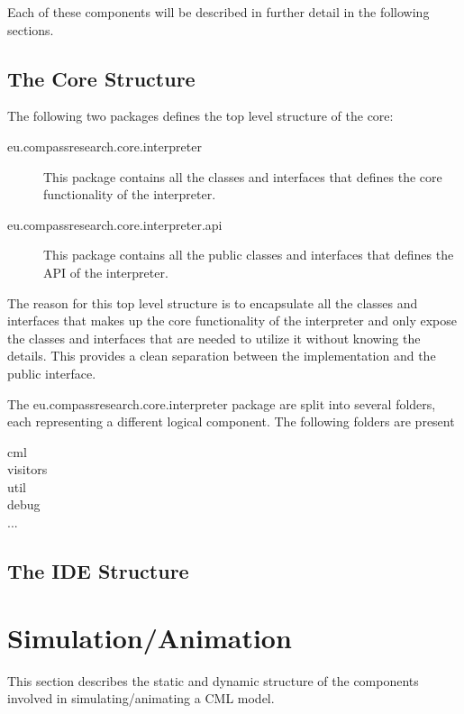 \documentclass[a4paper, 12pt]{include/compassreport}   %
\begin{document}
Each of these components will be described in further detail in the
following sections.

\subsection{The Core Structure}

The following two packages defines the top level
structure of the core:

\begin{description}
\item[eu.compassresearch.core.interpreter] This package contains all
  the classes and interfaces that defines the core functionality of the
  interpreter.
\item[eu.compassresearch.core.interpreter.api] This package contains
  all the public classes and interfaces that defines the API of the
  interpreter. 
\end{description}

The reason for this top level structure is to encapsulate all the
classes and interfaces that makes up the core functionality of the
interpreter and only expose the classes and interfaces that are needed
to utilize it without knowing the details. This provides a clean
separation between the implementation and the public interface.

The eu.compassresearch.core.interpreter package are split into several
folders, each representing a different logical component. The
following folders are present

\begin{description}
\item[cml] 
\item[visitors]
\item[util]
\item[debug]
\item[...]
\end{description}

\subsection{The IDE Structure}


\section{Simulation/Animation}
This section describes the static and dynamic structure of the
components involved in simulating/animating a CML model.
\end{document}
